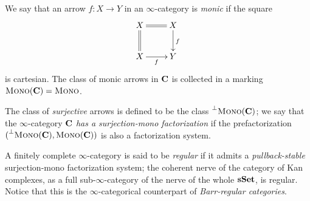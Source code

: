 \begin{example}\label{esem:monic}
We say that an arrow $f\colon X\to Y$ in an $\infty$\hyp{}category is \emph{monic} if the square
\[
\xymatrix{X \ar@{=}[r]\ar@{=}[d]& X \ar[d]^f \\ X \ar[r]_f & Y}
\]
is cartesian. The class of monic arrows in $\mathbf{C}$ is collected in a marking $\textsc{Mono}(\mathbf{C})=\textsc{Mono}$.

The class of \emph{surjective} arrows is defined to be the class $\prescript{\perp}{}{\textsc{Mono}(\mathbf{C})}$; we say that the $\infty$\hyp{}category $\mathbf{C}$ \emph{has a surjection\hyp{}mono factorization} if the prefactorization $(\prescript{\perp}{}{\textsc{Mono}(\mathbf{C})}, \textsc{Mono}(\mathbf{C}))$ is also a factorization system.
\end{example}
\begin{definition}
A finitely complete $\infty$\hyp{}category is said to be \emph{regular} if it admits a \emph{pullback\hyp{}stable} surjection\hyp{}mono factorization system; the coherent nerve of the category of Kan complexes, as a full sub\hyp{}$\infty$\hyp{}category of the nerve of the whole $\mathbf{sSet}$, is regular. Notice that this is the $\infty$\hyp{}categorical counterpart of \emph{Barr\hyp{}regular categories}.
\end{definition}
